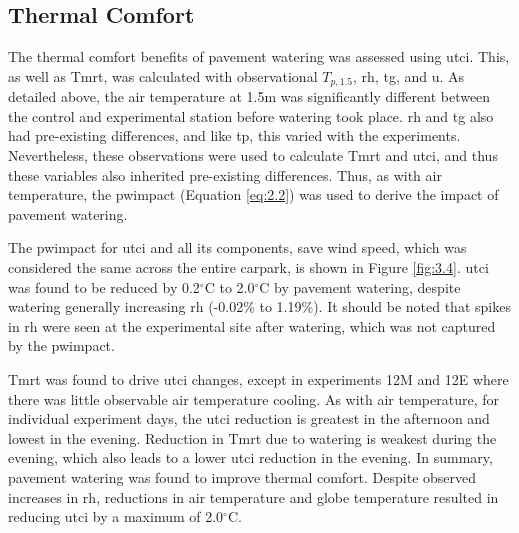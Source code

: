 \documentclass[final,3p,times,authoryear]{elsarticle}
\begin{document}
\subsection{Thermal Comfort}\label{sec:discussion3.2}

The thermal comfort benefits of pavement watering was assessed using \gls{utci}. This, as well as \gls{Tmrt}, was calculated with observational $T_{p,1.5}$, \gls{rh}, \gls{tg}, and \gls{u}. As detailed above, the air temperature at 1.5m was significantly different between the control and experimental station before watering took place. \gls{rh} and \gls{tg} also had pre-existing differences, and like \gls{tp}, this varied with the experiments. Nevertheless, these observations were used to calculate \gls{Tmrt} and \gls{utci}, and thus these variables also inherited pre-existing differences. Thus, as with air temperature, the \gls{pwimpact} (Equation \ref{eq:2.2}) was used to derive the impact of pavement watering.

The \gls{pwimpact} for \gls{utci} and all its components, save wind speed, which was considered the same across the entire carpark, is shown in Figure \ref{fig:3.4}. \gls{utci} was found to be reduced by 0.2$^{\circ}$C to 2.0$^{\circ}$C by pavement watering, despite watering generally increasing \gls{rh} (-0.02\% to 1.19\%). It should be noted that spikes in \gls{rh} were seen at the experimental site after watering, which was not captured by the \gls{pwimpact}. 

\gls{Tmrt} was found to drive \gls{utci} changes, except in experiments 12M and 12E where there was little observable air temperature cooling. As with air temperature, for individual experiment days, the \gls{utci} reduction is greatest in the afternoon and lowest in the evening. Reduction in \gls{Tmrt} due to watering is weakest during the evening, which also leads to a lower \gls{utci} reduction in the evening. In summary, pavement watering was found to improve thermal comfort. Despite observed increases in \gls{rh}, reductions in air temperature and globe temperature resulted in reducing \gls{utci} by a maximum of 2.0$^{\circ}$C.
\end{document}
